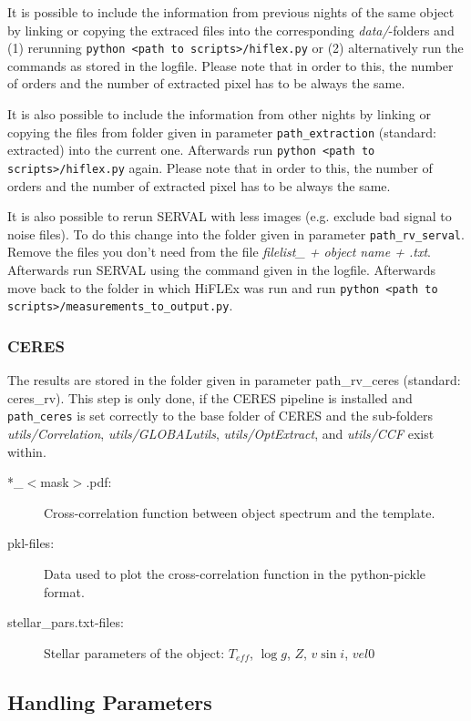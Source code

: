 \documentclass[10pt,a4paper]{article}
\begin{document}
It is possible to include the information from previous nights of the same object by linking or copying the extraced files into the corresponding \textit{data/}-folders and (1) rerunning \verb|python <path to scripts>/hiflex.py| or (2) alternatively run the commands as stored in the logfile. Please note that in order to this, the number of orders and the number of extracted pixel has to be always the same.

It is also possible to include the information from other nights by linking or copying the files from folder given in parameter \verb|path_extraction| (standard: extracted) into the current one. Afterwards run \verb|python <path to scripts>/hiflex.py| again. Please note that in order to this, the number of orders and the number of extracted pixel has to be always the same.

It is also possible to rerun SERVAL with less images (e.g. exclude bad signal to noise files). To do this change into the folder given in parameter \verb|path_rv_serval|. Remove the files you don't need from the file \textit{filelist\_ + object name + .txt}. Afterwards run SERVAL using the command given in the logfile. Afterwards move back to the folder in which HiFLEx was run and run \verb|python <path to scripts>/measurements_to_output.py|.

\subsubsection{CERES}
The results are stored in the folder given in parameter path\_rv\_ceres (standard: ceres\_rv).
This step is only done, if the CERES pipeline is installed and \verb|path_ceres| is set correctly to the base folder of CERES and the sub-folders \textit{utils/Correlation}, \textit{utils/GLOBALutils}, \textit{utils/OptExtract}, and \textit{utils/CCF} exist within.

\begin{description}
  \item[*\_$<$mask$>$.pdf:] Cross-correlation function between object spectrum and the template.
  \item[pkl-files:] Data used to plot the cross-correlation function in the python-pickle format.
  \item[stellar\_pars.txt-files:] Stellar parameters of the object: $T_{eff}$, $\log g$, $Z$, $v\sin i$, $vel0$
\end{description}


\subsection{Handling Parameters}
\end{document}
